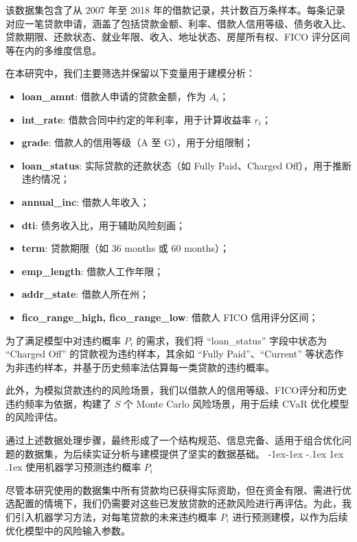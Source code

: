 \documentclass[12pt,nonblindrev]{write_paper}
\makeatletter
\renewcommand\subsection{\@startsection{subsection}{2}{\z@}%
                                     {-1ex\@plus -1ex \@minus -.1ex}%
                                     {1ex \@plus .1ex}%
                                     {\normalfont \normalsize \bfseries}}
\makeatother
\begin{document}
该数据集包含了从 2007 年至 2018 年的借款记录，共计数百万条样本。每条记录对应一笔贷款申请，涵盖了包括贷款金额、利率、借款人信用等级、债务收入比、贷款期限、还款状态、就业年限、收入、地址状态、房屋所有权、FICO 评分区间等在内的多维度信息。

在本研究中，我们主要筛选并保留以下变量用于建模分析：

\begin{itemize}
  \item \textbf{loan\_amnt}: 借款人申请的贷款金额，作为 $A_i$；
  \item \textbf{int\_rate}: 借款合同中约定的年利率，用于计算收益率 $r_i$；
  \item \textbf{grade}: 借款人的信用等级（A 至 G），用于分组限制；
  \item \textbf{loan\_status}: 实际贷款的还款状态（如 Fully Paid、Charged Off），用于推断违约情况；
  \item \textbf{annual\_inc}: 借款人年收入；
  \item \textbf{dti}: 债务收入比，用于辅助风险刻画；
  \item \textbf{term}: 贷款期限（如 36 months 或 60 months）；
  \item \textbf{emp\_length}: 借款人工作年限；
  \item \textbf{addr\_state}: 借款人所在州；
  \item \textbf{fico\_range\_high, fico\_range\_low}: 借款人 FICO 信用评分区间；
\end{itemize}

为了满足模型中对违约概率 $P_i$ 的需求，我们将 ``loan\_status'' 字段中状态为 ``Charged Off'' 的贷款视为违约样本，其余如 ``Fully Paid''、``Current'' 等状态作为非违约样本，并基于历史频率法估算每一类贷款的违约概率。

此外，为模拟贷款违约的风险场景，我们以借款人的信用等级、FICO评分和历史违约频率为依据，构建了 $S$ 个 Monte Carlo 风险场景，用于后续 CVaR 优化模型的风险评估。

通过上述数据处理步骤，最终形成了一个结构规范、信息完备、适用于组合优化问题的数据集，为后续实证分析与建模提供了坚实的数据基础。
\subsection{使用机器学习预测违约概率 $P_i$}
\label{subsec:predict_p_i}

尽管本研究使用的数据集中所有贷款均已获得实际资助，但在资金有限、需进行优选配置的情境下，我们仍需要对这些已发放贷款的还款风险进行再评估。为此，我们引入机器学习方法，对每笔贷款的未来违约概率 $P_i$ 进行预测建模，以作为后续优化模型中的风险输入参数。
\end{document}
